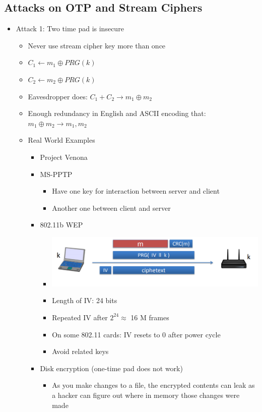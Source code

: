 \documentclass[]{article}
\begin{document}
\subsection{Attacks on OTP and Stream Ciphers}
\begin{itemize}
	\item Attack 1: Two time pad is insecure
	\begin{itemize}
		\item Never use stream cipher key more than once
		\item $C_{1} \leftarrow m_{1} \oplus PRG(k)$
		\item $C_{2} \leftarrow m_{2} \oplus PRG(k)$
		\item Eavesdropper does: $C_{1} + C_{2} \rightarrow m_{1} \oplus m_{2}$
		\item Enough redundancy in English and ASCII encoding that: $m_{1} \oplus m_{2} \rightarrow m_{1}, m_{2}$
		\item Real World Examples
		\begin{itemize}
			\item Project Venona
			\item MS-PPTP
			\begin{itemize}
				\item Have one key for interaction between server and client
				\item Another one between client and server
			\end{itemize}
			\item 802.11b WEP
			\begin{itemize}
				\item \includegraphics[scale=0.5]{Wep}
				\item Length of IV: 24 bits
				\item Repeated IV after $2^{24} \approx $ 16 M frames
				\item On some 802.11 cards: IV resets to 0 after power cycle
				\item Avoid related keys
			\end{itemize}
			\item Disk encryption (one-time pad does not work)
			\begin{itemize}
				\item As you make changes to a file, the encrypted contents can leak as a hacker can figure out where in memory those changes were made

\end{itemize}
\end{itemize}
\end{itemize}
\end{itemize}
\end{document}

